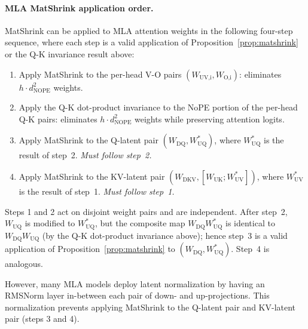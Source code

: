 \documentclass{article}
\newcommand{\WW}[1]{W_\text{#1}}                    %
\begin{document}
\paragraph{MLA MatShrink application order.}\label{prop:mla-order}
MatShrink can be applied to MLA attention weights in the following four-step sequence, where each step is a valid application of Proposition~\ref{prop:matshrink} or the Q-K invariance result above:
\begin{enumerate}[topsep=2pt, itemsep=0pt]
  \item Apply MatShrink to the per-head V-O pairs $(\WW{UV,i}, \WW{O,i})$: eliminates $h \cdot d_\text{NOPE}^2$ weights.
  \item Apply the Q-K dot-product invariance to the NoPE portion of the per-head Q-K pairs: eliminates $h \cdot d_\text{NOPE}^2$ weights while preserving attention logits.
  \item Apply MatShrink to the Q-latent pair $(\WW{DQ}, \WW{UQ}^*)$, where $\WW{UQ}^*$ is the result of step~2. \emph{Must follow step~2.}
  \item Apply MatShrink to the KV-latent pair $(\WW{DKV}, [\WW{UK}; \WW{UV}^*])$, where $\WW{UV}^*$ is the result of step~1. \emph{Must follow step~1.}
\end{enumerate}
Steps 1 and 2 act on disjoint weight pairs and are independent. After step~2, $\WW{UQ}$ is modified to $\WW{UQ}^*$, but the composite map $\WW{DQ} \WW{UQ}^*$ is identical to $\WW{DQ} \WW{UQ}$ (by the Q-K dot-product invariance above); hence step~3 is a valid application of Proposition~\ref{prop:matshrink} to $(\WW{DQ}, \WW{UQ}^*)$. Step~4 is analogous.

However, many MLA models deploy latent normalization by having an RMSNorm layer in-between each pair of down- and up-projections. This normalization prevents applying MatShrink to the Q-latent pair and KV-latent pair (steps 3 and 4).

\end{document}
